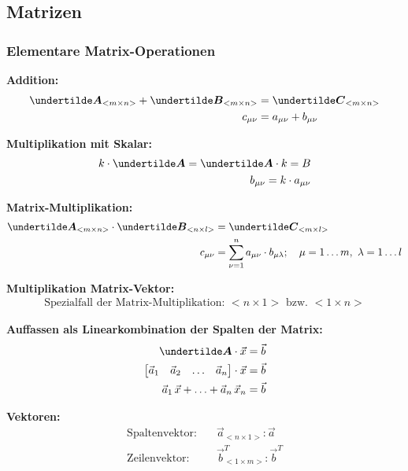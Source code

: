 \subsection{Matrizen}
\subsubsection{Elementare Matrix-Operationen}


\textbf{Addition:}
\begin{align*}
\ma{A}_{<m\times n>} + \ma{B}_{<m\times n>} &= \ma{C}_{<m\times n>}\\
c_{\mu\nu} &= a_{\mu\nu} + b_{\mu\nu}
\end{align*}

\textbf{Multiplikation mit Skalar:}
\begin{align*}
k \cdot \ma{A} = \ma{A} \cdot k = B\\
b_{\mu\nu} = k \cdot a_{\mu\nu}
\end{align*}

\textbf{Matrix-Multiplikation:}
\begin{align*}
\ma{A}_{<m\times n>} \cdot \ma{B}_{<n\times l>} &= \ma{C}_{<m\times l>}\\
c_{\mu\nu} &= \sum_{\nu=1}^{n} a_{\mu\nu} \cdot b_{\mu\lambda};\quad \mu=1\ldots m,\ \lambda=1\ldots l
\end{align*}

\textbf{Multiplikation Matrix-Vektor:}
\begin{align*}
\text{Spezialfall der Matrix-Multiplikation: } <n\times 1> \text{ bzw. } <1\times n>
\end{align*}

\textbf{Auffassen als Linearkombination der Spalten der Matrix:}
\begin{align*}
\ma{A} \cdot \vec{x} &= \vec{b}\\
\begin{bmatrix}\vec{a}_1 & \vec{a}_2 & \ldots & \vec{a}_n\end{bmatrix} \cdot \vec{x} &= \vec{b}\\
\vec{a}_1\,\vec{x} + \ldots + \vec{a}_n\,\vec{x}_n &= \vec{b}
\end{align*}

\textbf{Vektoren:}
\begin{align*}
\text{Spaltenvektor:} \quad & \vec{a}_{<n\times 1>}: \vec{a}\\
\text{Zeilenvektor:} \quad & \vec{b}_{<1\times m>}^T: \vec{b}^T
\end{align*}

